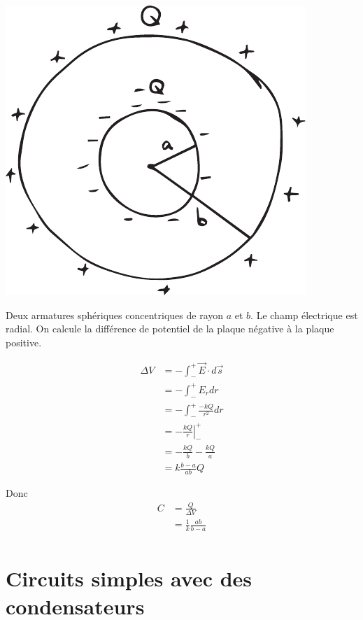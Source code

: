 \begin{center}
  \includegraphics[scale=0.5]{07-condensateurs/figures/condensateur-spherique.pdf}
\end{center}

Deux armatures sphériques concentriques de rayon $a$ et $b$. Le champ
électrique est radial. On calcule la différence de potentiel de la plaque
négative à la plaque positive.

\begin{align*}
  \Delta V &= - \int_-^+ \vec{E} \cdot d\vec{s} \\
           &= - \int_-^+ E_r dr \\
           &= - \int_-^+ \frac{-kQ}{r^2} dr \\
           &= - \left. \frac{kQ}{r} \right|_-^+ \\
           &= -\frac{kQ}{b} - \frac{kQ}{a} \\
           &= k \frac{b - a}{ab} Q
\end{align*}

Donc
\begin{align*}
  C &= \frac{Q}{\Delta V} \\
    &= \frac{1}{k} \frac{ab}{b - a} \\
\end{align*}


\sectionline


\section{Circuits simples avec des condensateurs}

